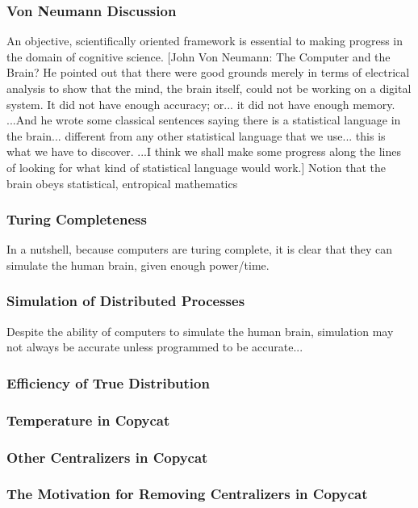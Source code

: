 \documentclass[a4paper]{article}
\begin{document}
        \subsubsection{Von Neumann Discussion}

    An objective, scientifically oriented framework is essential to making progress in the domain of cognitive science.
    [John Von Neumann: The Computer and the Brain?
    He pointed out that there were good grounds merely in terms of electrical analysis to show that the mind, the brain itself, could not be working on a digital system. It did not have enough accuracy; or... it did not have enough memory. ...And he wrote some classical sentences saying there is a statistical language in the brain... different from any other statistical language that we use... this is what we have to discover. ...I think we shall make some progress along the lines of looking for what kind of statistical language would work.]
    Notion that the brain obeys statistical, entropical mathematics

        \subsubsection{Turing Completeness}
            In a nutshell, because computers are turing complete, it is clear that they can simulate the human brain, given enough power/time.
        \subsubsection{Simulation of Distributed Processes}
            Despite the ability of computers to simulate the human brain, simulation may not always be accurate unless programmed to be accurate...
        \subsubsection{Efficiency of True Distribution}
        \subsubsection{Temperature in Copycat}
        \subsubsection{Other Centralizers in Copycat}
        \subsubsection{The Motivation for Removing Centralizers in Copycat}
\end{document}
